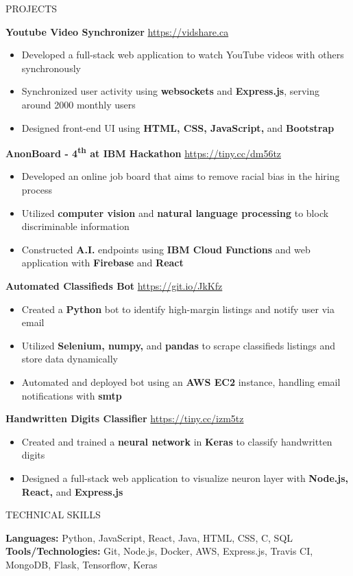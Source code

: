 \documentclass[letterpaper,11pt,oneside]{article}
\newcommand{\createHeading}[1]{
    \vspace{1.25em}
    \hline
    \vspace{-1.5ex}
    \begin{center}
        #1
    \end{center}
    \vspace{-1.5ex}
    \hline
    \vspace{1.25em}
}
\begin{document}
\createHeading{PROJECTS}
\begin{addmargin}[.6em]{.6em}
    \textbf{Youtube Video Synchronizer} \hfill \href{https://vidshare.ca}{https://vidshare.ca}
    \begin{itemize}
        \item Developed a full-stack web application to watch YouTube videos with others synchronously
        \item Synchronized user activity using \textbf{websockets} and \textbf{Express.js}, serving around 2000 monthly users
        \item Designed front-end UI using \textbf{HTML, CSS, JavaScript,} and \textbf{Bootstrap}
    \end{itemize}
    \vspace{1.25em}
    \textbf{AnonBoard - 4\textsuperscript{th} at IBM Hackathon} \hfill \href{https://tiny.cc/dm56tz}{https://tiny.cc/dm56tz}
    \begin{itemize}
        \item Developed an online job board that aims to remove racial bias in the hiring process
        \item Utilized \textbf{computer vision} and \textbf{natural language processing} to block discriminable information
        \item Constructed \textbf{A.I.} endpoints using \textbf{IBM Cloud Functions} and web application with \textbf{Firebase} and \textbf{React}
    \end{itemize}
    \vspace{1.25em}
    \textbf{Automated Classifieds Bot} \hfill \href{https://git.io/JkKfz}{https://git.io/JkKfz}
    \begin{itemize}
        \item Created a \textbf{Python} bot to identify high-margin listings and notify user via email
        \item Utilized \textbf{Selenium, numpy,} and \textbf{pandas} to scrape classifieds listings and store data dynamically
        \item Automated and deployed bot using an \textbf{AWS EC2} instance, handling email notifications with \textbf{smtp}
    \end{itemize}
    \vspace{1.25em}
    \textbf{Handwritten Digits Classifier} \hfill \href{https://handwritten-digits-ai.netlify.app/}{https://tiny.cc/izm5tz}
    \begin{itemize}
        \item Created and trained a \textbf{neural network} in \textbf{Keras} to classify handwritten digits
        \item Designed a full-stack web application to visualize neuron layer with \textbf{Node.js, React,} and \textbf{Express.js} 
    \end{itemize}
    \vspace{0.5em}
\end{addmargin}

\createHeading{TECHNICAL SKILLS}
\begin{addmargin}[.6em]{.6em}
    \textbf{Languages: } Python, JavaScript, React, Java, HTML, CSS, C, SQL \\
    \textbf{Tools/Technologies: } Git, Node.js, Docker, AWS, Express.js, Travis CI, MongoDB, Flask, Tensorflow, Keras
\end{addmargin}
\end{document}
